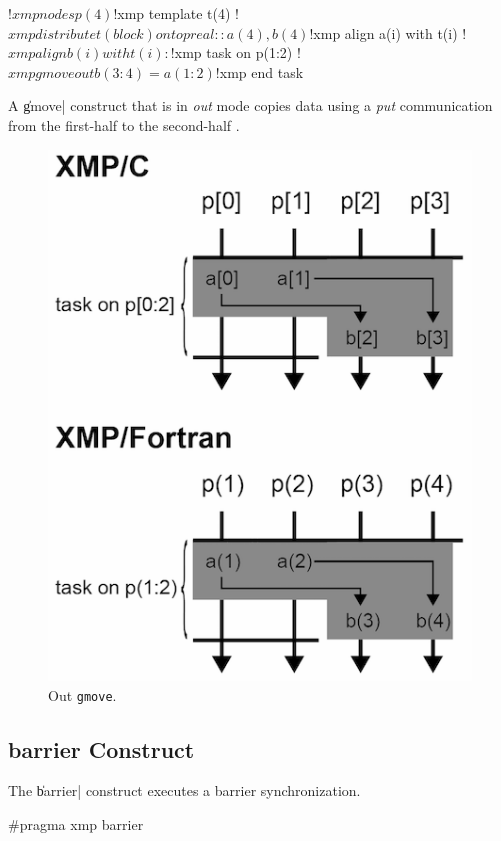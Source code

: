 \begin{XFexample}
!$xmp nodes p(4)
!$xmp template t(4)
!$xmp distribute t(block) onto p
real :: a(4), b(4)
!$xmp align a(i) with t(i)
!$xmp align b(i) with t(i)
   :
!$xmp task on p(1:2)
!$xmp gmove out
  b(3:4) = a(1:2)
!$xmp end task
\end{XFexample}

A \|gmove| construct that is in {\it out} mode copies data using a {\it put}
communication from the first-half {\nodes} to the second-half {\nodes}.

\begin{figure}
  \centering
  \includegraphics[width=0.9\columnwidth]{figs/gmove_out.png}
  \caption{Out {\tt gmove}.}
\end{figure}


\subsection{{\bf barrier} Construct}

The \|barrier| construct executes a barrier synchronization.

\begin{XCexample}
#pragma xmp barrier
\end{XCexample}

